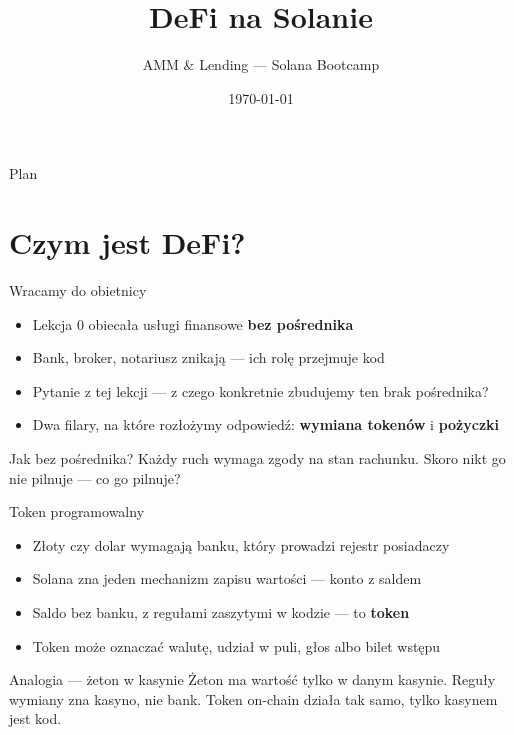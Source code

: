

\usepackage[utf8]{inputenc}
\usepackage[T1]{fontenc}
\usepackage{amsmath}

\title{DeFi na Solanie}
\subtitle{AMM \& Lending --- Solana Bootcamp}
\author{}
\date{\today}



\maketitleframe

\begin{frame}{Plan}
  \tableofcontents
\end{frame}

\section{Czym jest DeFi?}

\begin{frame}{Wracamy do obietnicy}
  \begin{itemize}
    \item Lekcja 0 obiecała usługi finansowe \textbf{bez pośrednika}
    \item Bank, broker, notariusz znikają --- ich rolę przejmuje kod
    \item Pytanie z tej lekcji --- z czego konkretnie zbudujemy ten brak pośrednika?
    \item Dwa filary, na które rozłożymy odpowiedź: \textbf{wymiana tokenów} i \textbf{pożyczki}
  \end{itemize}
  \vspace{0.25cm}
  \begin{alertblock}{Jak bez pośrednika?}
    Każdy ruch wymaga zgody na stan rachunku. Skoro nikt go nie pilnuje ---
    co go pilnuje?
  \end{alertblock}
\end{frame}

\begin{frame}{Token programowalny}
  \begin{itemize}
    \item Złoty czy dolar wymagają banku, który prowadzi rejestr posiadaczy
    \item Solana zna jeden mechanizm zapisu wartości --- konto z saldem
    \item Saldo bez banku, z regułami zaszytymi w kodzie --- to \textbf{token}
    \item Token może oznaczać walutę, udział w puli, głos albo bilet wstępu
  \end{itemize}
  \vspace{0.25cm}
  \begin{exampleblock}{Analogia --- żeton w kasynie}
    Żeton ma wartość tylko w danym kasynie. Reguły wymiany zna kasyno,
    nie bank. Token on-chain działa tak samo, tylko kasynem jest kod.
  \end{exampleblock}
\end{frame}

